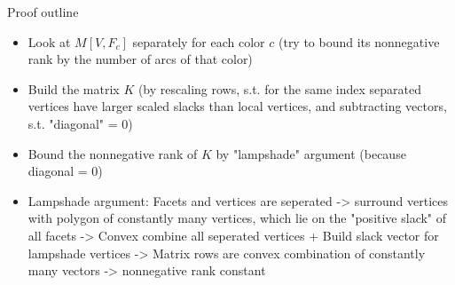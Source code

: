 Proof outline
\begin{itemize}
  \item Look at $M[V,F_c]$ separately for each color $c$ (try to bound its nonnegative rank by the number of arcs of that color)
  \item Build the matrix $K$ (by rescaling rows, s.t. for the same index separated vertices have larger scaled slacks than local vertices, and subtracting vectors, s.t. "diagonal" = 0)
  \item Bound the nonnegative rank of $K$ by "lampshade" argument (because diagonal = 0) 
  \item Lampshade argument: Facets and vertices are seperated -> surround vertices with polygon of constantly many vertices, which lie on the "positive slack" of all facets -> Convex combine all seperated vertices + Build slack vector for lampshade vertices -> Matrix rows are convex combination of constantly many vectors -> nonnegative rank constant
\end{itemize}